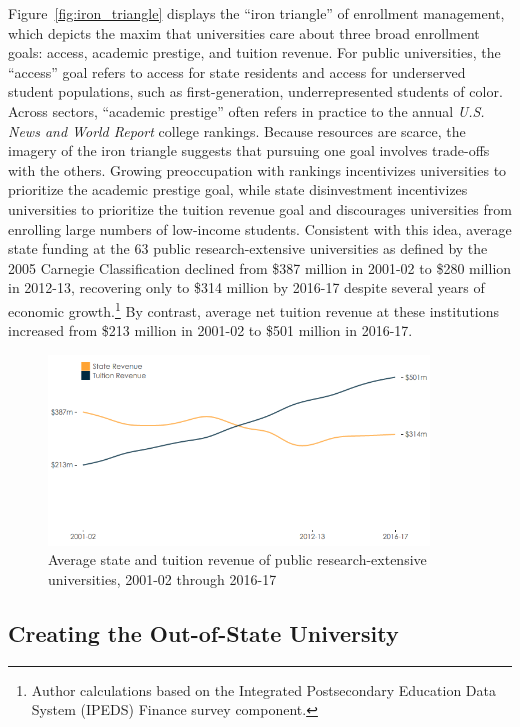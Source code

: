 \documentclass{article}
\begin{document}
Figure~\ref{fig:iron_triangle} displays the ``iron triangle'' of enrollment management, which depicts the maxim that universities care about three broad enrollment goals: access, academic prestige, and tuition revenue. For public universities, the ``access'' goal refers to access for state residents and access for underserved student populations, such as first-generation, underrepresented students of color. Across sectors, ``academic prestige'' often refers in practice to the annual \textit{U.S. News and World Report} college rankings. Because resources are scarce, the imagery of the iron triangle suggests that pursuing one goal involves trade-offs with the others. Growing preoccupation with rankings incentivizes universities to prioritize the academic prestige goal, while state disinvestment incentivizes universities to prioritize the   tuition revenue goal and discourages universities from enrolling large numbers of low-income students. Consistent with this idea, average state funding at the 63 public research-extensive universities as defined by the 2005 Carnegie Classification declined from \$387 million in 2001-02 to \$280 million in 2012-13, recovering only to \$314 million by 2016-17 despite several years of economic growth.\footnote{Author calculations based on the Integrated Postsecondary Education Data System (IPEDS) Finance survey component.} By contrast, average net tuition revenue at these institutions increased from \$213 million in 2001-02 to \$501 million in 2016-17.

\begin{figure}[!ht]
    \centering
    \includegraphics[width=0.9\textwidth]{assets/graphs/revenue_graph.png}
    \caption{Average state and tuition revenue of public research-extensive universities, 2001-02 through 2016-17}
    \label{fig:revenue_graph}
\end{figure}

\subsection*{Creating the Out-of-State University}
\end{document}
